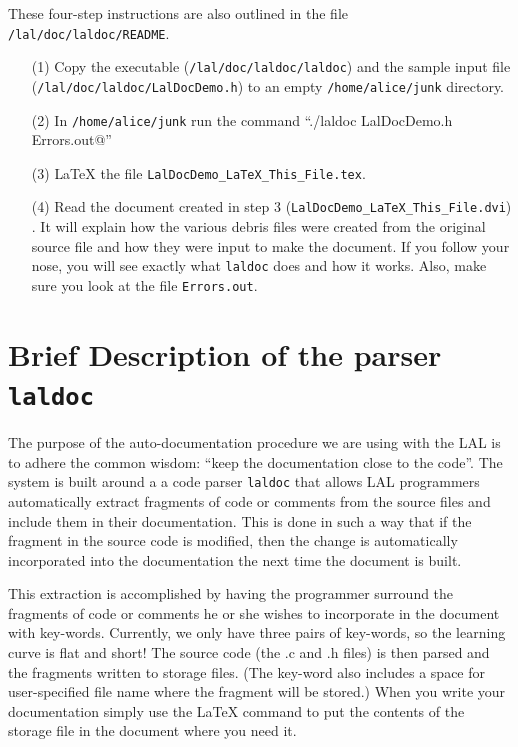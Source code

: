 \documentclass[oneside]{book}
\begin{document}
\noindent
These four-step instructions are also outlined in the file 
{\tt /lal/doc/laldoc/README}.

\begin{itemize}
\item[(1)] Copy the executable ({\tt /lal/doc/laldoc/laldoc}) 
and the  sample input file ({\tt /lal/doc/laldoc/LalDocDemo.h}) to an
empty  {\tt /home/alice/junk} directory. 
\item[(2)] In {\tt /home/alice/junk} 
run the command ``\verb@./laldoc LalDocDemo.h Errors.out@'' 
\item[(3)] {\LaTeX} the file {\texttt {LalDocDemo\_LaTeX\_This\_File.tex}}.
\item[(4)] Read the  document created in step 3
({\texttt {LalDocDemo\_LaTeX\_This\_File.dvi}}) . It will explain how
the various debris files were created from the original source file
and how they were input to make the document.  If you follow your
nose,  you will see exactly what  {\texttt {laldoc}} does and how it
works.  Also, make sure you look at the file {\tt Errors.out}.
\end{itemize}

\section{Brief Description of the parser {\texttt {laldoc}} }

The purpose of the auto-documentation procedure we are using with the
LAL is to adhere the common wisdom: ``keep the documentation close to
the code''.  The system is built around a a code
parser {\tt laldoc} that allows LAL programmers automatically extract fragments of
code or comments from the source files and include them in their
documentation.  This is done in such a way that if the fragment in the
source code is modified, then the change is automatically incorporated
into the documentation the next time the document is built.

This extraction is  accomplished by having the programmer surround the
fragments of code or comments he or she wishes to incorporate in the
document with key-words.  Currently, we only have three pairs of
key-words, so the learning curve is flat and short! The source code
(the .c and .h files) is then parsed and the fragments written to
storage files.  (The key-word also includes a space for user-specified file name
where the fragment will be stored.)  When you write your documentation simply
use the {\LaTeX} command \verb@@ to put the contents of the
storage file in the document where you need it.  
\end{document}
